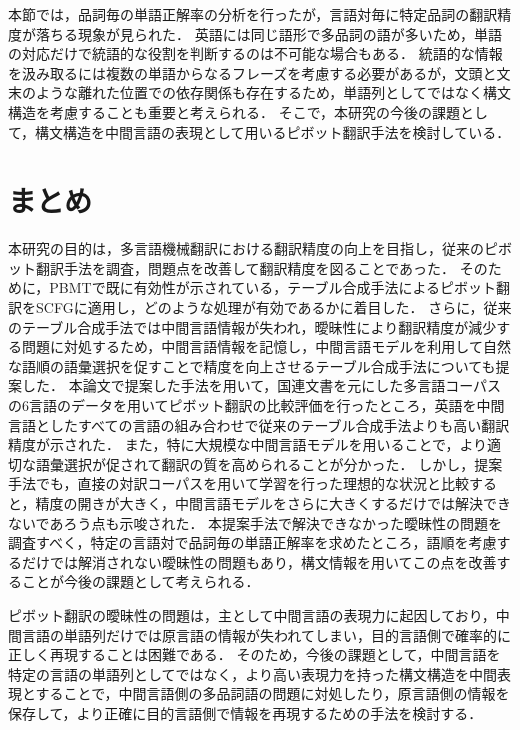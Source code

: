 \documentclass[japanese]{jnlp_1.4}
\begin{document}
本節では，品詞毎の単語正解率の分析を行ったが，言語対毎に特定品詞の翻訳精度が落ちる現象が見られた．
英語には同じ語形で多品詞の語が多いため，単語の対応だけで統語的な役割を判断するのは不可能な場合もある．
統語的な情報を汲み取るには複数の単語からなるフレーズを考慮する必要があるが，文頭と文末のような離れた位置での依存関係も存在するため，単語列としてではなく構文構造を考慮することも重要と考えられる．
そこで，本研究の今後の課題として，構文構造を中間言語の表現として用いるピボット翻訳手法を検討している．


\section{まとめ}

本研究の目的は，多言語機械翻訳における翻訳精度の向上を目指し，従来のピボット翻訳手法を調査，問題点を改善して翻訳精度を図ることであった．
そのために，PBMTで既に有効性が示されている，テーブル合成手法によるピボット翻訳をSCFGに適用し，どのような処理が有効であるかに着目した．
さらに，従来のテーブル合成手法では中間言語情報が失われ，曖昧性により翻訳精度が減少する問題に対処するため，中間言語情報を記憶し，中間言語モデルを利用して自然な語順の語彙選択を促すことで精度を向上させるテーブル合成手法についても提案した．
本論文で提案した手法を用いて，国連文書を元にした多言語コーパスの6言語のデータを用いてピボット翻訳の比較評価を行ったところ，英語を中間言語としたすべての言語の組み合わせで従来のテーブル合成手法よりも高い翻訳精度が示された．
また，特に大規模な中間言語モデルを用いることで，より適切な語彙選択が促されて翻訳の質を高められることが分かった．
しかし，提案手法でも，直接の対訳コーパスを用いて学習を行った理想的な状況と比較すると，精度の開きが大きく，中間言語モデルをさらに大きくするだけでは解決できないであろう点も示唆された．
本提案手法で解決できなかった曖昧性の問題を調査すべく，特定の言語対で品詞毎の単語正解率を求めたところ，語順を考慮するだけでは解消されない曖昧性の問題もあり，構文情報を用いてこの点を改善することが今後の課題として考えられる．

ピボット翻訳の曖昧性の問題は，主として中間言語の表現力に起因しており，中間言語の単語列だけでは原言語の情報が失われてしまい，目的言語側で確率的に正しく再現することは困難である．
そのため，今後の課題として，中間言語を特定の言語の単語列としてではなく，より高い表現力を持った構文構造を中間表現とすることで，中間言語側の多品詞語の問題に対処したり，原言語側の情報を保存して，より正確に目的言語側で情報を再現するための手法を検討する．
\end{document}
